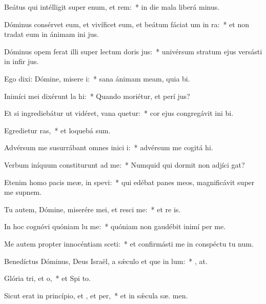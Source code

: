 \item Beátus qui intélligit super enum, et rem:~* in die mala liberá  minus.
\item Dóminus consérvet eum, et vivíficet eum, et beátum fáciat um in ra:~* et non tradat eum in ánimam ini jus.
\item Dóminus opem ferat illi super lectum doris jus:~* univérsum stratum ejus versásti in infir jus.
\item Ego dixi: Dómine, misere i:~* sana ánimam meam, quia  bi.
\item Inimíci mei dixérunt la hi:~* Quando moriétur, et perí  jus?
\item Et si ingrediebátur ut vidéret, vana quetur:~* cor ejus congregávit ini bi.
\item Egredietur ras,~* et loquebá  sum.
\item Advérsum me susurrábant omnes inici i:~* advérsum me cogitá  hi.
\item Verbum iníquum constiturunt ad me:~* Numquid qui dormit non adjíci  gat?
\item Etenim homo pacis meæ, in  spevi:~* qui edébat panes meos, magnificávit super me supnem.
\item Tu autem, Dómine, miserére mei, et resci me:~* et re is.
\item In hoc cognóvi quóniam lu me:~* quóniam non gaudébit inimí  per me.
\item Me autem propter innocéntiam sceti:~* et confirmásti me in conspéctu tu  num.
\item Benedíctus Dóminus, Deus Israël, a sǽculo et que in lum:~* , at.
\item Glória tri, et o,~* et Spi to.
\item Sicut erat in princípio, et , et per,~* et in sǽcula sæ. men.
